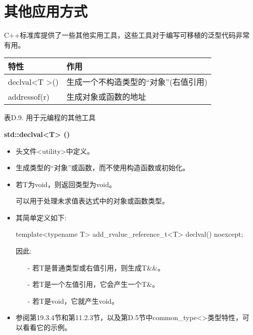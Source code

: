 \section{其他应用方式}


C++标准库提供了一些其他实用工具，这些工具对于编写可移植的泛型代码非常有用。

\begin{table}[H]
	\begin{center}
	\begin{tabular}{l|l}
		\hline
		\textbf{特性}                       & \textbf{作用}                                                         \\ \hline
		declval\textless{}T \textgreater{}() & 生成一个不构造类型的“对象”(右值引用) \\ \hline
		addressof(r)                         & 生成对象或函数的地址                             \\ \hline
	\end{tabular}
	\end{center}
\end{table}

\begin{center}
表D.9. 用于元编程的其他工具
\end{center}

\textbf{std::declval<T> ()}

\begin{itemize}
\item 
头文件<utility>中定义。

\item 
生成类型的“对象”或函数，而不使用构造函数或初始化。

\item 
若T为void，则返回类型为void。

可以用于处理未求值表达式中的对象或函数类型。

\item 
其简单定义如下:
\begin{cpp}
template<typename T>
add_rvalue_reference_t<T> declval() noexcept;
\end{cpp}

因此:

\begin{itemize}
\item[-]
若T是普通类型或右值引用，则生成T\&\&。

\item[-]
若T是一个左值引用，它会产生一个T\&。

\item[-]
若T是void，它就产生void。
\end{itemize}

\item 
参阅第19.3.4节和第11.2.3节，以及第D.5节中common\_type<>类型特性，可以看看它的示例。
\end{itemize}

